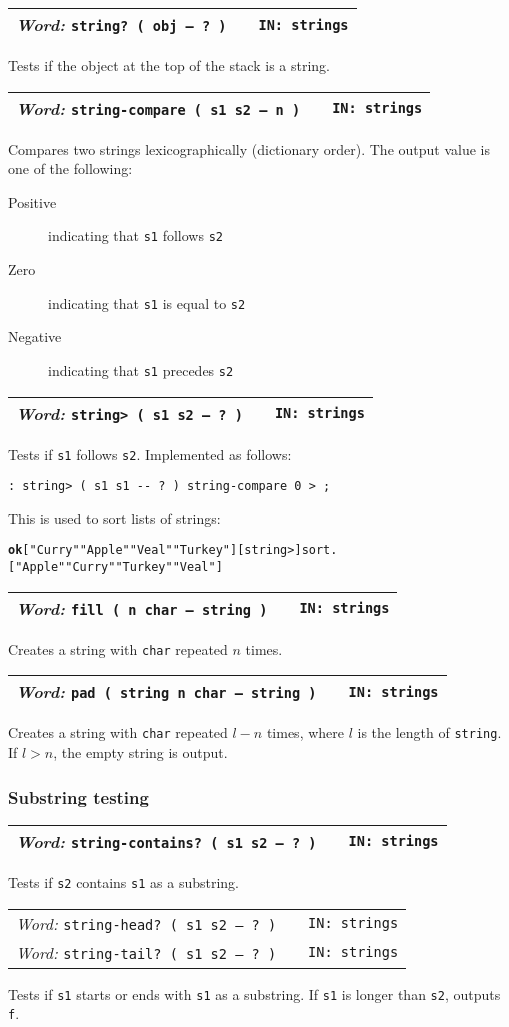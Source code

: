 \documentclass{report}
\newcommand{\ordinaryword}[3]{\index{#1}
\emph{Word:} \texttt{#2} &&\texttt{IN: #3}}
\newcommand{\wordtable}[1]{

\begin{tabularx}{12cm}[t]{lXr}
\hline
#1\\
\hline
\end{tabularx}

}
\begin{document}
\wordtable{
\ordinaryword{string?}{string?~( obj -- ?~)}{strings}
}
Tests if the object at the top of the stack is a string.
\wordtable{
\ordinaryword{string-compare}{string-compare~( s1 s2 -- n )}{strings}
}
Compares two strings lexicographically (dictionary order). The output value is one of the following:
\begin{description}
\item[Positive] indicating that \texttt{s1} follows \texttt{s2}
\item[Zero] indicating that \texttt{s1} is equal to \texttt{s2}
\item[Negative] indicating that \texttt{s1} precedes \texttt{s2}
\end{description}
\wordtable{
\ordinaryword{string>}{string> ( s1 s2 -- ?~)}{strings}
}
Tests if \texttt{s1} follows \texttt{s2}. Implemented as follows:
\begin{verbatim}
: string> ( s1 s1 -- ? ) string-compare 0 > ;
\end{verbatim}
This is used to sort lists of strings:
\begin{alltt}
\textbf{ok} [ "Curry" "Apple" "Veal" "Turkey" ] [ string> ] sort .
[ "Apple" "Curry" "Turkey" "Veal" ]
\end{alltt}
\wordtable{
\ordinaryword{fill}{fill~( n char -- string )}{strings}
}
Creates a string with \texttt{char} repeated $n$ times.
\wordtable{
\ordinaryword{pad}{pad~( string n char -- string )}{strings}
}
Creates a string with \texttt{char} repeated $l-n$ times, where $l$ is the length of \texttt{string}. If $l>n$, the empty string is output.

\subsubsection{Substring testing}

\wordtable{
\ordinaryword{string-contains?}{string-contains?~( s1 s2 -- ?~)}{strings}
}
Tests if \texttt{s2} contains \texttt{s1} as a substring.
\wordtable{
\ordinaryword{string-head?}{string-head?~( s1 s2 -- ?~)}{strings}\\
\ordinaryword{string-tail?}{string-tail?~( s1 s2 -- ?~)}{strings}
}
Tests if \texttt{s1} starts or ends with \texttt{s1} as a substring. If \texttt{s1} is longer than \texttt{s2}, outputs \texttt{f}.
\end{document}
